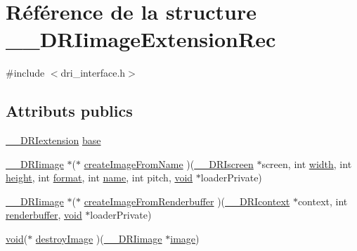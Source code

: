 \hypertarget{struct_____d_r_iimage_extension_rec}{\section{Référence de la structure \-\_\-\-\_\-\-D\-R\-Iimage\-Extension\-Rec}
\label{struct_____d_r_iimage_extension_rec}
}


{\ttfamily \#include $<$dri\-\_\-interface.\-h$>$}

\subsection*{Attributs publics}
\begin{DoxyCompactItemize}
\item 
\hyperlink{dri__interface_8h_a4e0a61c8ece00d2b2c6792a9a1b55385}{\-\_\-\-\_\-\-D\-R\-Iextension} \hyperlink{struct_____d_r_iimage_extension_rec_a0705eddcc3909eb2c216213a4ba74040}{base}
\item 
\hyperlink{dri__interface_8h_a37e0407153595dc88fe5d25127645cf1}{\-\_\-\-\_\-\-D\-R\-Iimage} $\ast$($\ast$ \hyperlink{struct_____d_r_iimage_extension_rec_a4b0079557bc9e31cc22e2c676fbeb72d}{create\-Image\-From\-Name} )(\hyperlink{dri__interface_8h_a9961b01d421ee1fd6ed3c05acc9ca561}{\-\_\-\-\_\-\-D\-R\-Iscreen} $\ast$screen, int \hyperlink{gl_8h_a30a197eaed803ac3cd1b444d4c972354}{width}, int \hyperlink{gl_8h_aab021b2df174b06135ca6744356dcf34}{height}, int \hyperlink{gl_8h_a623c5b7577f9ec4174db688b61b73be7}{format}, int \hyperlink{glext_8h_aaced7cfc21e7d37775d6921bb8177239}{name}, int pitch, \hyperlink{glu_8h_a4292190e3f1f6b373a760c7d9316ad3c}{void} $\ast$loader\-Private)
\item 
\hyperlink{dri__interface_8h_a37e0407153595dc88fe5d25127645cf1}{\-\_\-\-\_\-\-D\-R\-Iimage} $\ast$($\ast$ \hyperlink{struct_____d_r_iimage_extension_rec_ac33038f1d4d0767dc32ad84525af3c03}{create\-Image\-From\-Renderbuffer} )(\hyperlink{dri__interface_8h_a3fd295cba82b5a3d79f1ee7e12bfb908}{\-\_\-\-\_\-\-D\-R\-Icontext} $\ast$context, int \hyperlink{glext_8h_a2de59ce19521dddd661a02a95abc2764}{renderbuffer}, \hyperlink{glu_8h_a4292190e3f1f6b373a760c7d9316ad3c}{void} $\ast$loader\-Private)
\item 
\hyperlink{glu_8h_a4292190e3f1f6b373a760c7d9316ad3c}{void}($\ast$ \hyperlink{struct_____d_r_iimage_extension_rec_a75984079230a666b2ac73aa524bc8b42}{destroy\-Image} )(\hyperlink{dri__interface_8h_a37e0407153595dc88fe5d25127645cf1}{\-\_\-\-\_\-\-D\-R\-Iimage} $\ast$\hyperlink{gl_8h_a4f252db605f5b9117603096756e79824}{image})

\end{DoxyCompactItemize}

